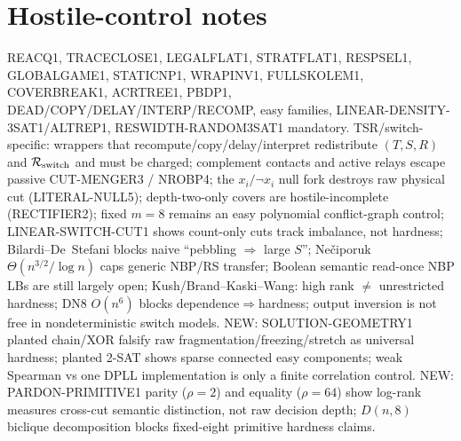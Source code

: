 \documentclass[11pt]{article}
\begin{document}
\section*{Hostile-control notes}
REACQ1, TRACECLOSE1, LEGALFLAT1, STRATFLAT1, RESPSEL1, GLOBALGAME1, STATICNP1, WRAPINV1,
FULLSKOLEM1, COVERBREAK1, ACRTREE1, PBDP1, DEAD/COPY/DELAY/INTERP/RECOMP, easy families,
LINEAR-DENSITY-3SAT1/ALTREP1, RESWIDTH-RANDOM3SAT1 mandatory.
TSR/switch-specific: wrappers that recompute/copy/delay/interpret redistribute $(T,S,R)$ and
$\mathcal R_{\rm switch}$ and must be charged; complement contacts and active relays escape
passive CUT-MENGER3 / NROBP4; the $x_i/\neg x_i$ null fork destroys raw physical cut
(LITERAL-NULL5); depth-two-only covers are hostile-incomplete (RECTIFIER2);
fixed $m=8$ remains an easy polynomial conflict-graph control;
LINEAR-SWITCH-CUT1 shows count-only cuts track imbalance, not hardness;
Bilardi--De~Stefani blocks naive ``pebbling $\Rightarrow$ large $S$'';
Ne\v{c}iporuk $\Theta(n^{3/2}/\log n)$ caps generic NBP/RS transfer;
Boolean semantic read-once NBP LBs are still largely open;
Kush/Brand--Kaski--Wang: high rank $\neq$ unrestricted hardness;
DN8 $O(n^6)$ blocks dependence$\Rightarrow$hardness;
output inversion is not free in nondeterministic switch models.
NEW: SOLUTION-GEOMETRY1 planted chain/XOR falsify raw fragmentation/freezing/stretch as
universal hardness; planted 2-SAT shows sparse connected easy components; weak Spearman
vs one DPLL implementation is only a finite correlation control.
NEW: PARDON-PRIMITIVE1 parity ($\rho=2$) and equality ($\rho=64$) show log-rank measures
cross-cut semantic distinction, not raw decision depth; $D(n,8)$ biclique decomposition
blocks fixed-eight primitive hardness claims.
\end{document}
